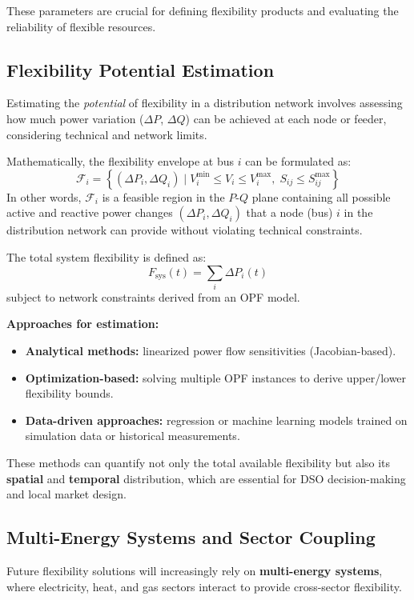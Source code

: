 \documentclass[11pt]{article}
\begin{document}
	These parameters are crucial for defining flexibility products and evaluating the reliability of flexible resources.
	
	\subsection{Flexibility Potential Estimation}
	
	Estimating the \textit{potential} of flexibility in a distribution network involves assessing how much power variation ($\Delta P$, $\Delta Q$) can be achieved at each node or feeder, considering technical and network limits.
	
	Mathematically, the flexibility envelope at bus $i$ can be formulated as:
	\[
	\mathcal{F}_i = \left\{ (\Delta P_i, \Delta Q_i) \;|\; V_i^{\min} \le V_i \le V_i^{\max}, \; S_{ij} \le S_{ij}^{\max} \right\}
	\]
	In other words, $\mathcal{F}_i$ is a feasible region in the $P$-$Q$ plane containing all possible active and reactive power changes $(\Delta P_i,\Delta Q_i)$ that a node (bus)
	$i$ in the distribution network can provide without violating technical constraints.
	
	The total system flexibility is defined as:
	\[
	F_\text{sys}(t) = \sum_{i} \Delta P_i(t)
	\]
	subject to network constraints derived from an OPF model.
	
	\textbf{Approaches for estimation:}
	\begin{itemize}
		\item \textbf{Analytical methods:} linearized power flow sensitivities (Jacobian-based).
		\item \textbf{Optimization-based:} solving multiple OPF instances to derive upper/lower flexibility bounds.
		\item \textbf{Data-driven approaches:} regression or machine learning models trained on simulation data or historical measurements.
	\end{itemize}
	
	These methods can quantify not only the total available flexibility but also its \textbf{spatial} and \textbf{temporal} distribution, which are essential for DSO decision-making and local market design.
	
	\subsection{Multi-Energy Systems and Sector Coupling}
	
	Future flexibility solutions will increasingly rely on \textbf{multi-energy systems}, where electricity, heat, and gas sectors interact to provide cross-sector flexibility.
	
\end{document}
